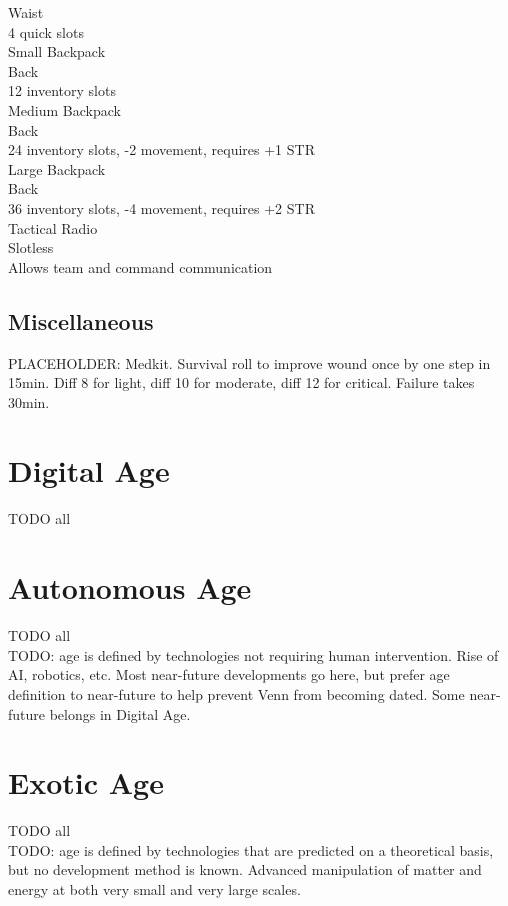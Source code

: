 \documentclass[letterpaper,titlepage,openany,twocolumn]{book}
\begin{document}
Waist\\
4 quick slots\\
Small Backpack\\
Back\\
12 inventory slots\\
Medium Backpack\\
Back\\
24 inventory slots, -2 movement, requires +1 STR\\
Large Backpack\\
Back\\
36 inventory slots, -4 movement, requires +2 STR\\
Tactical Radio\\
Slotless\\
Allows team and command communication\\

\section{Miscellaneous}
PLACEHOLDER: Medkit. Survival roll to improve wound once by one step in 15min. Diff 8 for light, diff 10 for moderate, diff 12 for critical. Failure takes 30min.\\

\chapter{Digital Age}
TODO all\\

\chapter{Autonomous Age}
TODO all\\
TODO: age is defined by technologies not requiring human intervention. Rise of AI, robotics, etc. Most near-future developments go here, but prefer age definition to near-future to help prevent Venn from becoming dated. Some near-future belongs in Digital Age.\\

\chapter{Exotic Age}
TODO all\\
TODO: age is defined by technologies that are predicted on a theoretical basis, but no development method is known. Advanced manipulation of matter and energy at both very small and very large scales.\\
\end{document}
